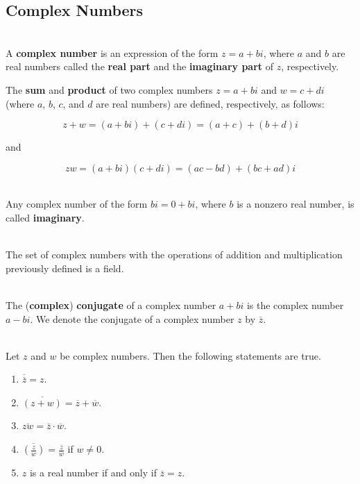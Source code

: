\begin{alphasection}
	\setcounter{alphasect}{3}
	\section{Complex Numbers}

	\begin{definition}
		\hfill\\
		A \textbf{complex number} is an expression of the form $z = a + bi$, where $a$ and $b$ are real numbers called the \textbf{real part} and the \textbf{imaginary part} of $z$, respectively.

		The \textbf{sum} and \textbf{product} of two complex numbers $z = a + bi$ and $w = c+di$ (where $a$, $b$, $c$, and $d$ are real numbers) are defined, respectively, as follows:

		\[z+w = (a + bi) + (c+di) = (a+c) + (b+d)i\]

		and

		\[zw = (a+bi)(c+di) = (ac-bd)+(bc+ad)i\]
	\end{definition}

	\begin{definition}
		\hfill\\
		Any complex number of the form $bi=0 + bi$, where $b$ is a nonzero real number, is called \textbf{imaginary}.
	\end{definition}

	\begin{theorem}
		\hfill\\
		The set of complex numbers with the operations of addition and multiplication previously defined is a field.
	\end{theorem}

	\begin{definition}
		\hfill\\
		The (\textbf{complex}) \textbf{conjugate} of a complex number $a+bi$ is the complex number $a-bi$. We denote the conjugate of a complex number $z$ by $\overline{z}$.
	\end{definition}

	\begin{theorem}
		\hfill\\
		Let $z$ and $w$ be complex numbers. Then the following statements are true.

		\begin{enumerate}
			\item $\overline{\overline{z}} = z$.
			\item $\overline{(z+ w)} = \overline{z}+ \overline{w}$.
			\item $\overline{zw} = \overline{z}\cdot\overline{w}$.
			\item $\overline{(\frac{z}{w})} = \frac{\overline{z}}{\overline{w}}$ if $w \neq 0$.
			\item $z$ is a real number if and only if $\overline{z} = z$.
		\end{enumerate}
	\end{theorem}


\end{alphasection}
